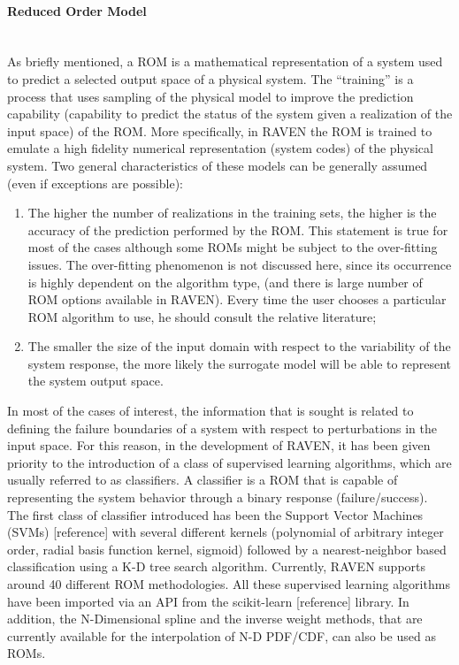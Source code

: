 \paragraph{Reduced Order Model} ~\\
 As briefly mentioned, a ROM is a mathematical representation of a system used to predict a selected output space of a physical system. 
The ``training'' is a process that uses sampling of the physical model to improve the prediction capability (capability to predict the status of the system given a realization of the input space) of the ROM. More specifically, in RAVEN the ROM is trained to emulate a high fidelity numerical representation (system codes) of the physical system. Two general characteristics of these models can be generally assumed (even if exceptions are possible):
\begin{enumerate}
   \item The higher the number of realizations in the training sets, the higher is the accuracy of the prediction performed by the 
   ROM. This statement is true for most of the cases although some ROMs might be subject to the over-fitting issues. The over-fitting 
   phenomenon is not discussed here, since its occurrence is highly dependent on the algorithm type, (and there is large number of 
   ROM options available in RAVEN). Every time the user chooses a particular ROM algorithm to use, he should consult the relative 
   literature;
   \item The smaller the size of the input domain with respect to the variability of the system response, the more likely the surrogate 
   model will be able to represent the system output space.
\end{enumerate}
In most of the cases of interest, the information that is sought is related to defining the failure boundaries of a system with respect to perturbations in the input space. For this reason, in the development of RAVEN, it has been given priority to the introduction of a class of supervised learning algorithms, which are usually referred to as classifiers. A classifier is a ROM that is capable of representing the system behavior through a binary response (failure/success). 
\\The first class of classifier introduced has been the Support Vector Machines (SVMs) [reference] with several different kernels (polynomial of arbitrary integer order, radial basis function kernel, sigmoid) followed by a nearest-neighbor based classification using a K-D tree search algorithm. Currently, RAVEN supports around 40 different ROM methodologies. All these supervised learning algorithms have been imported via an API from the scikit-learn [reference] library. In addition, the N-Dimensional spline and the inverse weight methods, that are currently available for the interpolation of N-D PDF/CDF, can also be used as ROMs.
